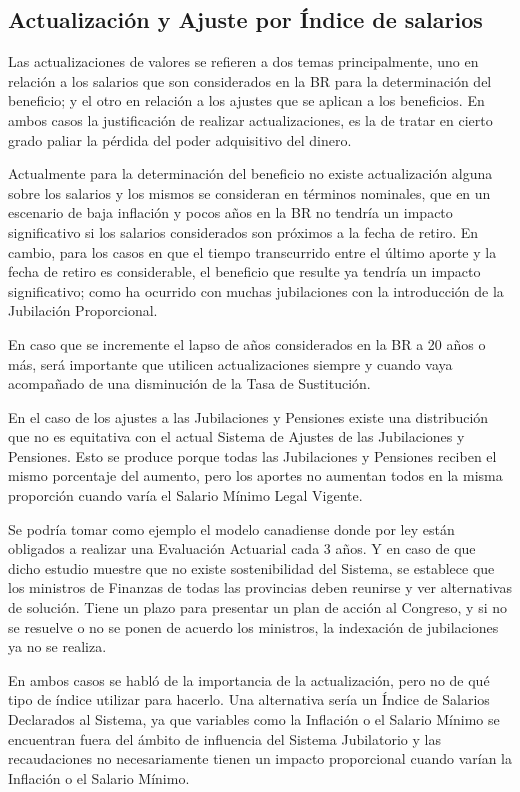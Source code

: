 \documentclass[a4paper,11pt]{article}
\begin{document}
\subsection{Actualización y Ajuste por Índice de salarios}

Las actualizaciones de valores se refieren a dos temas principalmente, uno en relación a los salarios que son considerados en la BR para la determinación del beneficio; y el otro en relación a los ajustes que se aplican a los beneficios.  En ambos casos la justificación de realizar actualizaciones, es la de tratar en cierto grado paliar la pérdida del poder adquisitivo del dinero.

Actualmente para la determinación del beneficio no existe actualización alguna sobre los salarios y los mismos se consideran en términos nominales, que en un escenario de baja inflación y pocos años en la BR no tendría un impacto significativo si los salarios considerados son próximos a la fecha de retiro.  En cambio, para los casos en que el tiempo transcurrido entre el último aporte y la fecha de retiro es considerable, el beneficio que resulte ya tendría un impacto significativo; como ha ocurrido con muchas jubilaciones con la introducción de la Jubilación Proporcional.

En caso que se incremente el lapso de años considerados en la BR a 20 años o más, será importante que utilicen actualizaciones siempre y cuando vaya acompañado de una disminución de la Tasa de Sustitución.

En el caso de los ajustes a las Jubilaciones y Pensiones existe una distribución que no es equitativa con el actual Sistema de Ajustes de las Jubilaciones y Pensiones. Esto se produce porque todas las Jubilaciones y Pensiones reciben el mismo porcentaje del aumento, pero los aportes no aumentan todos en la misma proporción cuando varía el Salario Mínimo Legal Vigente.

Se podría tomar como ejemplo el modelo canadiense donde por ley están obligados a realizar una Evaluación Actuarial cada 3 años. Y en caso de que dicho estudio muestre que no existe sostenibilidad del Sistema, se establece que los ministros de Finanzas de todas las provincias deben reunirse y ver alternativas de solución. Tiene un plazo para presentar un plan de acción al Congreso, y si no se resuelve o no se ponen de acuerdo los ministros, la indexación de jubilaciones ya no se realiza.

En ambos casos se habló de la importancia de la actualización, pero no de qué tipo de índice utilizar para hacerlo.  Una alternativa sería un Índice de Salarios Declarados al Sistema, ya que variables como la Inflación o el Salario Mínimo se encuentran fuera del ámbito de influencia del Sistema Jubilatorio y las recaudaciones no necesariamente tienen un impacto proporcional cuando varían la Inflación o el Salario Mínimo.
\end{document}
